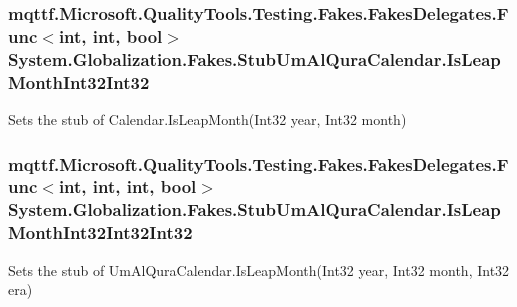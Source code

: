 \hypertarget{class_system_1_1_globalization_1_1_fakes_1_1_stub_um_al_qura_calendar_a66e168946379bc653cbf7a9a54779f4c}{
\subsubsection[{Is\-Leap\-Month\-Int32\-Int32}]{\setlength{\rightskip}{0pt plus 5cm}mqttf.\-Microsoft.\-Quality\-Tools.\-Testing.\-Fakes.\-Fakes\-Delegates.\-Func$<$int, int, bool$>$ System.\-Globalization.\-Fakes.\-Stub\-Um\-Al\-Qura\-Calendar.\-Is\-Leap\-Month\-Int32\-Int32}}\label{class_system_1_1_globalization_1_1_fakes_1_1_stub_um_al_qura_calendar_a66e168946379bc653cbf7a9a54779f4c}


Sets the stub of Calendar.\-Is\-Leap\-Month(\-Int32 year, Int32 month)

\hypertarget{class_system_1_1_globalization_1_1_fakes_1_1_stub_um_al_qura_calendar_a263ee5aad366b3dab80bc8180845ee8b}{
\subsubsection[{Is\-Leap\-Month\-Int32\-Int32\-Int32}]{\setlength{\rightskip}{0pt plus 5cm}mqttf.\-Microsoft.\-Quality\-Tools.\-Testing.\-Fakes.\-Fakes\-Delegates.\-Func$<$int, int, int, bool$>$ System.\-Globalization.\-Fakes.\-Stub\-Um\-Al\-Qura\-Calendar.\-Is\-Leap\-Month\-Int32\-Int32\-Int32}}\label{class_system_1_1_globalization_1_1_fakes_1_1_stub_um_al_qura_calendar_a263ee5aad366b3dab80bc8180845ee8b}


Sets the stub of Um\-Al\-Qura\-Calendar.\-Is\-Leap\-Month(\-Int32 year, Int32 month, Int32 era)

